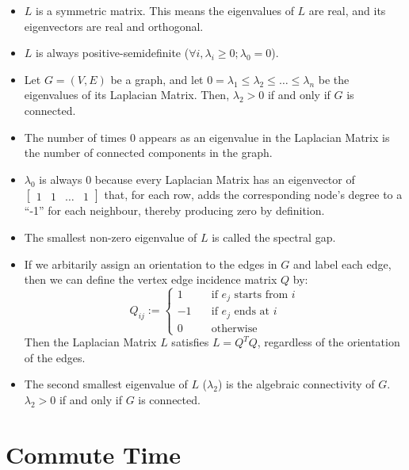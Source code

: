 \begin{itemize}
\item $L$ is a symmetric matrix. This means the eigenvalues of $L$ are real, and
its eigenvectors are real and orthogonal.
\item $L$ is always positive-semidefinite ($\forall i, \lambda_{i} \geq 0; 
\lambda_{0} = 0$).
\item Let $G = (V,E)$ be a graph, and let $0 = \lambda_{1} \leq \lambda_{2}
\leq \ldots \leq \lambda_{n}$ be the eigenvalues of its Laplacian Matrix. Then, 
$\lambda_{2} > 0$ if and only if $G$ is connected.
\item The number of times $0$ appears as an eigenvalue in the Laplacian Matrix 
is the number of connected components in the graph.
\item $\lambda_{0}$ is always $0$ because every Laplacian Matrix has an 
eigenvector of $\begin{bmatrix} 1 & 1 & \ldots & 1 \end{bmatrix}$ that, for each
row, adds the corresponding node's degree to a ``-1'' for each neighbour, 
thereby producing zero by definition.
\item The smallest non-zero eigenvalue of $L$ is called the spectral gap.
\item If we arbitarily assign an orientation to the edges in $G$ and label each
edge, then we can define the vertex edge incidence matrix $Q$ by:
\begin{displaymath}
Q_{ij} := 
    \left\{
        \begin{array}{ll}
            1 &     \quad \text{if $e_{j}$ starts from $i$} \\
            -1 &    \quad \text{if $e_{j}$ ends at $i$} \\
            0 &     \quad \text{otherwise}
        \end{array}
    \right.
\end{displaymath}
Then the Laplacian Matrix $L$ satisfies $L = Q^{T}Q$, regardless of the 
orientation of the edges.
\item The second smallest eigenvalue of $L$ ($\lambda_{2}$) is the algebraic 
connectivity of $G$. $\lambda_{2} > 0$ if and only if $G$ is connected.
\end{itemize}

\section{Commute Time}
\label{sec:commuteTime}

